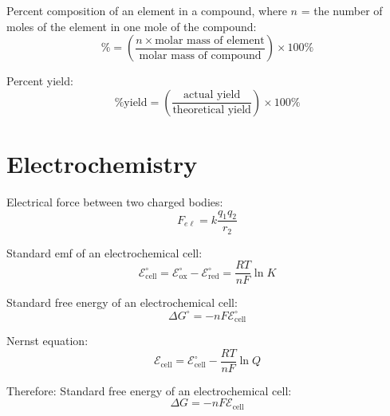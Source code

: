 \documentclass[10pt]{article}
\def\Ecell{$\mathscr{E}_{\textrm{cell}}$}
\def\Enotcell{$\mathscr{E}^{\circ}_{\textrm{cell}}$}
\def\not{^\circ}
\begin{document}
Percent composition of an element in a compound, where $n$ = the number of moles of the element in one mole of the compound:
\begin{equation*}
\% = \left(\frac{n\times \textrm{molar mass of element}}{\textrm{molar mass of compound}}\right)\times 100\%
\end{equation*}

Percent yield:
\begin{equation*}
\textrm{\% yield} = \left(\frac{\textrm{actual yield}}{\textrm{theoretical yield}}\right)\times 100\%
\end{equation*}


\newpage
\section{Electrochemistry}


Electrical force between two charged bodies:
\begin{equation*}
F_{e\ell}=k\frac{q_1q_2}{r_2}
\end{equation*}

Standard emf of an electrochemical cell:
\begin{equation*}
\textrm{\Enotcell} = \textrm{$\mathscr{E}^{\circ}_{\textrm{ox}}$} - \textrm{$\mathscr{E}^{\circ}_{\textrm{red}}$}  = \frac{RT}{nF} \ln K
\end{equation*}

Standard free energy of an electrochemical cell:
\begin{equation*}
\Delta G\not = -nF\textrm{\Enotcell}
\end{equation*}

Nernst equation:
\begin{equation*}
\textrm{\Ecell} = \textrm{\Enotcell} - \frac{RT}{nF}\ln Q
\end{equation*}

Therefore:
Standard free energy of an electrochemical cell:
\begin{equation*}
\Delta G = -nF\textrm{\Ecell}
\end{equation*}
\end{document}
